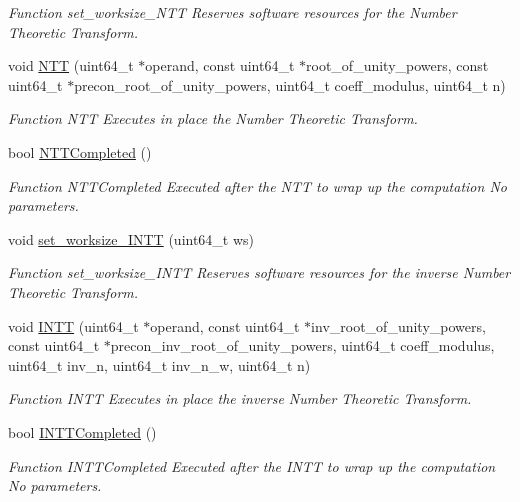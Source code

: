 \begin{DoxyCompactItemize}
\begin{DoxyCompactList}\small\item\em Function set\-\_\-worksize\-\_\-\-N\-T\-T Reserves software resources for the Number Theoretic Transform. \end{DoxyCompactList}\item 
void \hyperlink{namespaceintel_1_1hexl_aba58174859e0cfb87d493606a9e8a530}{N\-T\-T} (uint64\-\_\-t $\ast$operand, const uint64\-\_\-t $\ast$root\-\_\-of\-\_\-unity\-\_\-powers, const uint64\-\_\-t $\ast$precon\-\_\-root\-\_\-of\-\_\-unity\-\_\-powers, uint64\-\_\-t coeff\-\_\-modulus, uint64\-\_\-t n)
\begin{DoxyCompactList}\small\item\em Function N\-T\-T Executes in place the Number Theoretic Transform. \end{DoxyCompactList}\item 
bool \hyperlink{namespaceintel_1_1hexl_abeacc492f814f3fdf8659bd8067dc732}{N\-T\-T\-Completed} ()
\begin{DoxyCompactList}\small\item\em Function N\-T\-T\-Completed Executed after the N\-T\-T to wrap up the computation No parameters. \end{DoxyCompactList}\item 
void \hyperlink{namespaceintel_1_1hexl_a5fd09ace83ab47ba6d55eb4fde0973d8}{set\-\_\-worksize\-\_\-\-I\-N\-T\-T} (uint64\-\_\-t ws)
\begin{DoxyCompactList}\small\item\em Function set\-\_\-worksize\-\_\-\-I\-N\-T\-T Reserves software resources for the inverse Number Theoretic Transform. \end{DoxyCompactList}\item 
void \hyperlink{namespaceintel_1_1hexl_add1b2b65fe1dc30cfd2683dfb6f4dde6}{I\-N\-T\-T} (uint64\-\_\-t $\ast$operand, const uint64\-\_\-t $\ast$inv\-\_\-root\-\_\-of\-\_\-unity\-\_\-powers, const uint64\-\_\-t $\ast$precon\-\_\-inv\-\_\-root\-\_\-of\-\_\-unity\-\_\-powers, uint64\-\_\-t coeff\-\_\-modulus, uint64\-\_\-t inv\-\_\-n, uint64\-\_\-t inv\-\_\-n\-\_\-w, uint64\-\_\-t n)
\begin{DoxyCompactList}\small\item\em Function I\-N\-T\-T Executes in place the inverse Number Theoretic Transform. \end{DoxyCompactList}\item 
bool \hyperlink{namespaceintel_1_1hexl_a87e4fb9429d04f09bbb0de8497aab0f7}{I\-N\-T\-T\-Completed} ()
\begin{DoxyCompactList}\small\item\em Function I\-N\-T\-T\-Completed Executed after the I\-N\-T\-T to wrap up the computation No parameters. \end{DoxyCompactList}\end{DoxyCompactItemize}


